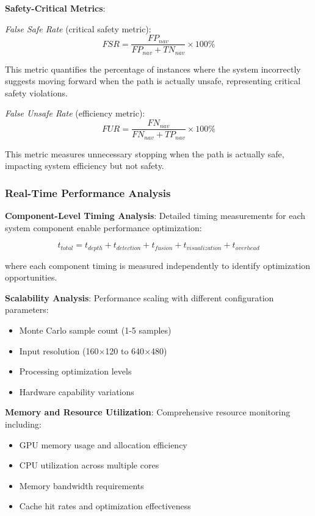 \documentclass[12pt,oneside]{book}
\begin{document}
\textbf{Safety-Critical Metrics}:

\textit{False Safe Rate} (critical safety metric):
\begin{equation}
FSR = \frac{FP_{nav}}{FP_{nav} + TN_{nav}} \times 100\%
\end{equation}

This metric quantifies the percentage of instances where the system incorrectly suggests moving forward when the path is actually unsafe, representing critical safety violations.

\textit{False Unsafe Rate} (efficiency metric):
\begin{equation}
FUR = \frac{FN_{nav}}{FN_{nav} + TP_{nav}} \times 100\%
\end{equation}

This metric measures unnecessary stopping when the path is actually safe, impacting system efficiency but not safety.

\subsubsection{Real-Time Performance Analysis}

\textbf{Component-Level Timing Analysis}:
Detailed timing measurements for each system component enable performance optimization:

\begin{equation}
t_{total} = t_{depth} + t_{detection} + t_{fusion} + t_{visualization} + t_{overhead}
\end{equation}

where each component timing is measured independently to identify optimization opportunities.

\textbf{Scalability Analysis}:
Performance scaling with different configuration parameters:
\begin{itemize}
\item Monte Carlo sample count (1-5 samples)
\item Input resolution (160$\times$120 to 640$\times$480)
\item Processing optimization levels
\item Hardware capability variations
\end{itemize}

\textbf{Memory and Resource Utilization}:
Comprehensive resource monitoring including:
\begin{itemize}
\item GPU memory usage and allocation efficiency
\item CPU utilization across multiple cores
\item Memory bandwidth requirements
\item Cache hit rates and optimization effectiveness
\end{itemize}
\end{document}
